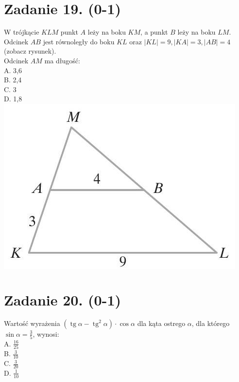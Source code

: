 \documentclass[10pt]{article}
\begin{document}
\section*{Zadanie 19. (0-1)}
W trójkącie \(K L M\) punkt \(A\) leży na boku \(K M\), a punkt \(B\) leży na boku \(L M\). Odcinek \(A B\) jest równoległy do boku \(K L\) oraz \(|K L|=9,|K A|=3,|A B|=4\) (zobacz rysunek).\\
Odcinek \(A M\) ma długość:\\
A. 3,6\\
B. 2,4\\
C. 3\\
D. 1,8\\
\includegraphics[max width=\textwidth, center]{2024_11_21_cdea326d19d0c2132b88g-06(1)}

\section*{Zadanie 20. (0-1)}
Wartość wyrażenia \(\left(\operatorname{tg} \alpha-\operatorname{tg}^{2} \alpha\right) \cdot \cos \alpha\) dla kąta ostrego \(\alpha\), dla którego \(\sin \alpha=\frac{3}{5}\), wynosi:\\
A. \(\frac{16}{25}\)\\
B. \(\frac{3}{10}\)\\
C. \(\frac{3}{20}\)\\
D. \(\frac{1}{10}\)
\end{document}

